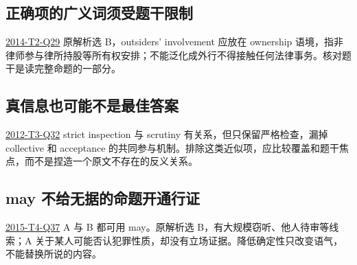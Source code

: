 \documentclass[11pt,a4paper]{article}
\begin{document}
\subsection{正确项的广义词须受题干限制}
\noindent \hyperref[idx-2014-T2-Q29]{2014-T2-Q29}
原解析选 B，outsiders’ involvement 应放在 ownership 语境，指非律师参与律所持股等所有权安排；不能泛化成外行不得接触任何法律事务。核对题干是读完整命题的一部分。\par
{}
\subsection{真信息也可能不是最佳答案}
\noindent \hyperref[idx-2012-T3-Q32]{2012-T3-Q32}
strict inspection 与 scrutiny 有关系，但只保留严格检查，漏掉 collective 和 acceptance 的共同参与机制。排除这类近似项，应比较覆盖和题干焦点，而不是捏造一个原文不存在的反义关系。\par
{}
\subsection{may 不给无据的命题开通行证}
\noindent \hyperref[idx-2015-T4-Q37]{2015-T4-Q37}
A 与 B 都可用 may。原解析选 B，有大规模窃听、他人待审等线索；A 关于某人可能否认犯罪性质，却没有立场证据。降低确定性只改变语气，不能替换所说的内容。\par
\clearpage
\end{document}
